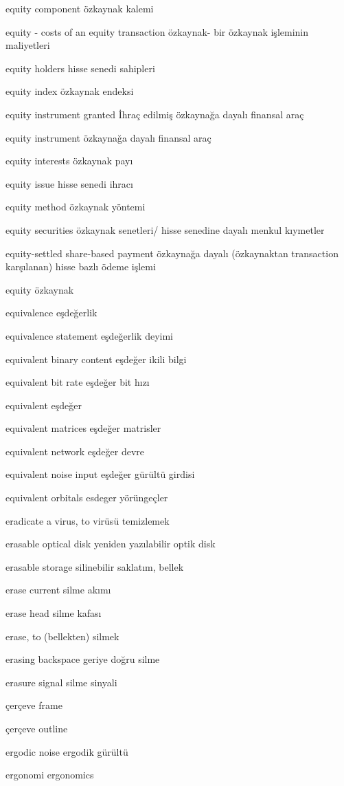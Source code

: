 \documentclass[12pt,fleqn]{article}\usepackage{../../common}
\begin{document}
equity component özkaynak kalemi

equity - costs of an equity transaction özkaynak- bir özkaynak işleminin maliyetleri

equity holders hisse senedi sahipleri

equity index özkaynak endeksi

equity instrument granted İhraç edilmiş özkaynağa dayalı finansal araç

equity instrument özkaynağa dayalı finansal araç

equity interests özkaynak payı

equity issue hisse senedi ihracı

equity method özkaynak yöntemi

equity securities özkaynak senetleri/ hisse senedine dayalı menkul kıymetler

equity-settled share-based payment özkaynağa dayalı (özkaynaktan transaction karşılanan) hisse bazlı ödeme işlemi

equity özkaynak

equivalence eşdeğerlik

equivalence statement eşdeğerlik deyimi

equivalent binary content eşdeğer ikili bilgi

equivalent bit rate eşdeğer bit hızı

equivalent eşdeğer

equivalent matrices eşdeğer matrisler

equivalent network eşdeğer devre

equivalent noise input eşdeğer gürültü girdisi

equivalent orbitals esdeger yörüngeçler

eradicate a virus, to virüsü temizlemek

erasable optical disk yeniden yazılabilir optik disk

erasable storage silinebilir saklatım, bellek

erase current silme akımı

erase head silme kafası

erase, to (bellekten) silmek

erasing backspace geriye doğru silme

erasure signal silme sinyali

çerçeve frame

çerçeve outline

ergodic noise ergodik gürültü

ergonomi ergonomics
\end{document}
